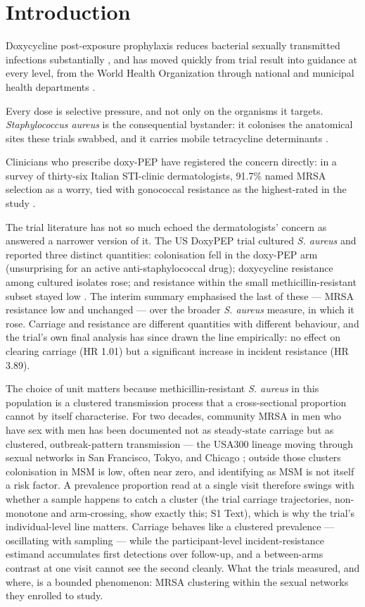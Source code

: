 \documentclass[10pt,letterpaper]{article}
\begin{document}
\linenumbers

\section*{Introduction}

Doxycycline post-exposure prophylaxis reduces bacterial sexually
transmitted infections substantially \cite{luetkemeyer2023}, and has
moved quickly from trial result into guidance at every level, from the
World Health Organization through national and municipal health
departments \cite{cdc2024doxypep, sfdph2022}.

Every dose is selective pressure, and not only on the organisms it
targets. \emph{Staphylococcus aureus} is the consequential bystander: it
colonises the anatomical sites these trials swabbed, and it carries
mobile tetracycline determinants \cite{grossman2016}.

Clinicians who prescribe doxy-PEP have registered the concern directly:
in a survey of thirty-six Italian STI-clinic dermatologists, 91.7\%
named MRSA selection as a worry, tied with gonococcal resistance as the
highest-rated in the study \cite{dona2026}.

The trial literature has not so much echoed the dermatologists' concern
as answered a narrower version of it. The US DoxyPEP trial cultured
\emph{S. aureus} and reported three distinct quantities: colonisation
fell in the doxy-PEP arm (unsurprising for an active anti-staphylococcal
drug); doxycycline resistance among cultured isolates rose; and
resistance within the small methicillin-resistant subset stayed low
\cite{luetkemeyer2023croi}. The interim summary emphasised the last of
these --- MRSA resistance low and unchanged --- over the broader
\emph{S. aureus} measure, in which it rose. Carriage and resistance are
different quantities with different behaviour, and the trial's own final
analysis has since drawn the line empirically: no effect on clearing
carriage (HR 1.01) but a significant increase in incident resistance (HR
3.89).

The choice of unit matters because methicillin-resistant \emph{S.
aureus} in this population is a clustered transmission process that a cross-sectional proportion cannot by itself characterise. For two decades, community MRSA in men who have
sex with men has been documented not as steady-state carriage but as
clustered, outbreak-pattern transmission --- the USA300 lineage moving
through sexual networks in San Francisco, Tokyo, and Chicago
\cite{diep2008, dejong2025}; outside those clusters colonisation in MSM
is low, often near zero, and identifying as MSM is not itself a risk
factor. A prevalence proportion read at a single visit therefore swings
with whether a sample happens to catch a cluster (the trial carriage
trajectories, non-monotone and arm-crossing, show exactly this;
S1 Text), which is why the trial's individual-level line
matters. Carriage behaves like a clustered prevalence --- oscillating with sampling --- while the participant-level incident-resistance estimand accumulates first detections over follow-up, and a between-arms
contrast at one visit cannot see the second cleanly. What the trials
measured, and where, is a bounded phenomenon: MRSA clustering within the
sexual networks they enrolled to study.
\end{document}
